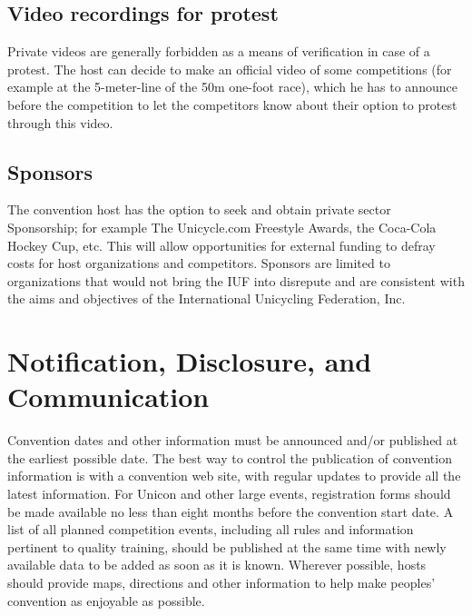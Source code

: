 \subsection{Video recordings for protest}
Private videos are generally forbidden as a means of verification in case of a protest. 
The host can decide to make an official video of some competitions (for example at the 5-meter-line of the 50m one-foot race), which he has to announce before the competition to let the competitors know about their option to protest through this video.

\subsection{Sponsors}
The convention host has the option to seek and obtain private sector Sponsorship; for example The Unicycle.com Freestyle Awards, the Coca-Cola Hockey Cup, etc. 
This will allow opportunities for external funding to defray costs for host organizations and competitors. 
Sponsors are limited to organizations that would not bring the IUF into disrepute and are consistent with the aims and objectives of the International Unicycling Federation, Inc.

\section{Notification, Disclosure, and Communication}
Convention dates and other information must be announced and/or published at the earliest possible date. 
The best way to control the publication of convention information is with a convention web site, with regular updates to provide all the latest information. 
For Unicon and other large events, registration forms should be made available no less than eight months before the convention start date. 
A list of all planned competition events, including all rules and information pertinent to quality training, should be published at the same time with newly available data to be added as soon as it is known. 
Wherever possible, hosts should provide maps, directions and other information to help make peoples' convention as enjoyable as possible.

